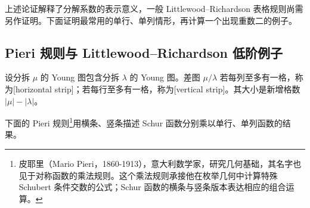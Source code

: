 上述论证解释了分解系数的表示意义，一般 Littlewood--Richardson 表格规则尚需另作证明。下面证明最常用的单行、单列情形，再计算一个出现重数二的例子。

\subsection{Pieri 规则与 Littlewood–Richardson 低阶例子}
\label{b5:subsec:0704:02}

\begin{definition}\label{b5:def:horizontal-vertical-strip}
	设分拆 \(\mu\) 的 Young 图包含分拆 \(\lambda\) 的 Young 图。差图 \(\mu/\lambda\) 若每列至多有一格，称为[horizontal strip]；若每行至多有一格，称为[vertical strip]。其大小是新增格数 \(|\mu|-|\lambda|\)。
\end{definition}

下面的 Pieri 规则\footnote{皮耶里（Mario Pieri，1860-1913），意大利数学家，研究几何基础，其名字也见于对称函数的乘法规则。这个乘法规则承接他在枚举几何中计算特殊 Schubert 条件交数的公式；Schur 函数的横条与竖条版本表达相应的组合运算。}用横条、竖条描述 Schur 函数分别乘以单行、单列函数的结果。

